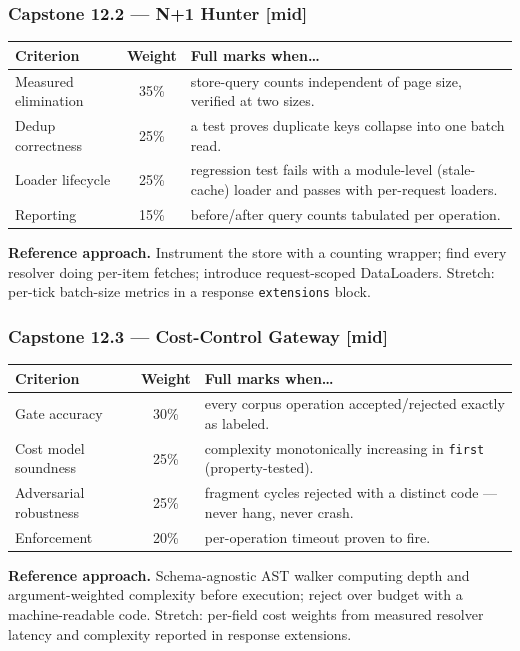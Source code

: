 \subsubsection*{Capstone 12.2 --- N+1 Hunter [mid]}
\begin{center}\small
\begin{tabularx}{\textwidth}{l c X}
\toprule
\textbf{Criterion} & \textbf{Weight} & \textbf{Full marks when\ldots} \\
\midrule
Measured elimination & 35\% & store-query counts independent of page size, verified at two sizes. \\
Dedup correctness & 25\% & a test proves duplicate keys collapse into one batch read. \\
Loader lifecycle & 25\% & regression test fails with a module-level (stale-cache) loader and passes with per-request loaders. \\
Reporting & 15\% & before/after query counts tabulated per operation. \\
\bottomrule
\end{tabularx}
\end{center}
\textbf{Reference approach.} Instrument the store with a counting wrapper;
find every resolver doing per-item fetches; introduce request-scoped
DataLoaders. Stretch: per-tick batch-size metrics in a response
\texttt{extensions} block.

\subsubsection*{Capstone 12.3 --- Cost-Control Gateway [mid]}
\begin{center}\small
\begin{tabularx}{\textwidth}{l c X}
\toprule
\textbf{Criterion} & \textbf{Weight} & \textbf{Full marks when\ldots} \\
\midrule
Gate accuracy & 30\% & every corpus operation accepted/rejected exactly as labeled. \\
Cost model soundness & 25\% & complexity monotonically increasing in \texttt{first} (property-tested). \\
Adversarial robustness & 25\% & fragment cycles rejected with a distinct code --- never hang, never crash. \\
Enforcement & 20\% & per-operation timeout proven to fire. \\
\bottomrule
\end{tabularx}
\end{center}
\textbf{Reference approach.} Schema-agnostic AST walker computing depth and
argument-weighted complexity before execution; reject over budget with a
machine-readable code. Stretch: per-field cost weights from measured
resolver latency and complexity reported in response extensions.

